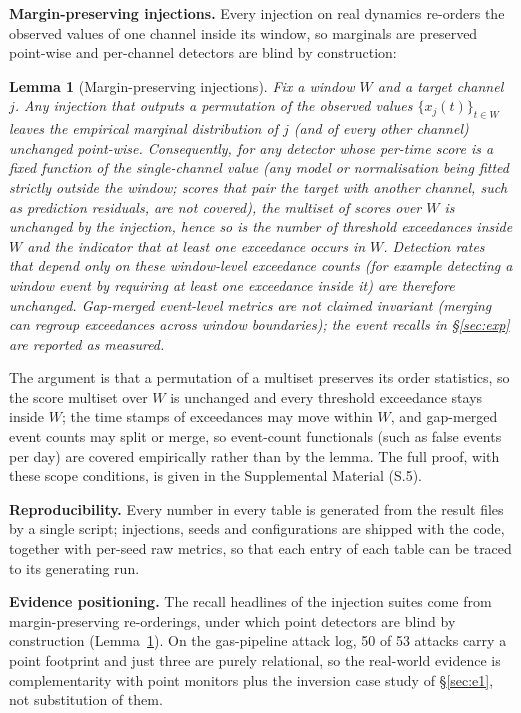 \documentclass[11pt,a4paper]{article}
\newtheorem{lemma}{Lemma}
\begin{document}
\textbf{Margin-preserving injections.} Every injection on real dynamics
re-orders the observed values of one channel inside its window, so
marginals are preserved point-wise and per-channel detectors are blind by
construction:

\begin{lemma}[Margin-preserving injections]\label{lemma:margin}
Fix a window $W$ and a target channel $j$. Any injection that outputs a
permutation of the observed values $\{x_j(t)\}_{t\in W}$ leaves the empirical
marginal distribution of $j$ (and of every other channel) unchanged
point-wise. Consequently, for any detector whose per-time score is a fixed function of the
single-channel value (any model or normalisation being fitted strictly
outside the window; scores that pair the target with another channel, such
as prediction residuals, are not covered), the multiset of scores over $W$ is unchanged by
the injection, hence so is the number of threshold exceedances inside $W$ and
the indicator that at least one exceedance occurs in $W$. Detection rates that depend only on these window-level exceedance
counts (for example detecting a window event by requiring at least one
exceedance inside it) are therefore unchanged. Gap-merged event-level
metrics are not claimed invariant (merging can regroup exceedances across
window boundaries); the event recalls in \S\ref{sec:exp} are reported as
measured.
\end{lemma}

\noindent The argument is that a permutation of a multiset preserves its
order statistics, so the score multiset over $W$ is unchanged and every
threshold exceedance stays inside $W$; the time stamps of exceedances may move
within $W$, and gap-merged event counts may split or merge, so event-count
functionals (such as false events per day) are covered empirically rather
than by the lemma. The full proof, with these scope conditions, is given
in the Supplemental Material (S.5).

\textbf{Reproducibility.} Every number in every table is generated from the
result files by a single script; injections, seeds and configurations are
shipped with the code, together with per-seed raw metrics, so that each entry of each table can be traced to its generating run.

\textbf{Evidence positioning.} The recall headlines of the injection suites
come from margin-preserving re-orderings, under which point detectors are
blind by construction (Lemma~\ref{lemma:margin}). On the gas-pipeline attack
log, 50 of 53 attacks carry a point footprint and just
three are purely relational, so the real-world evidence is complementarity
with point monitors plus the inversion case study of \S\ref{sec:e1},
not substitution of them.
\end{document}
